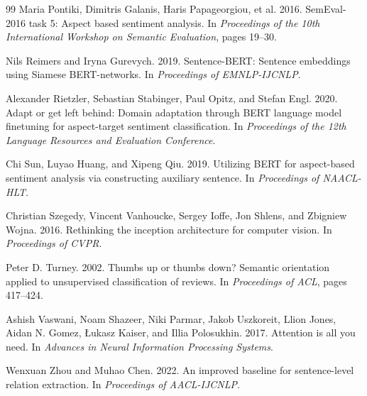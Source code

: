 \documentclass[11pt]{article}
\begin{document}
\begin{thebibliography}{99}
Maria Pontiki, Dimitris Galanis, Haris Papageorgiou, et al. 2016. SemEval-2016 task 5: Aspect based sentiment analysis. In \textit{Proceedings of the 10th International Workshop on Semantic Evaluation}, pages 19--30.

Nils Reimers and Iryna Gurevych. 2019. Sentence-BERT: Sentence embeddings using Siamese BERT-networks. In \textit{Proceedings of EMNLP-IJCNLP}.

Alexander Rietzler, Sebastian Stabinger, Paul Opitz, and Stefan Engl. 2020. Adapt or get left behind: Domain adaptation through BERT language model finetuning for aspect-target sentiment classification. In \textit{Proceedings of the 12th Language Resources and Evaluation Conference}.

Chi Sun, Luyao Huang, and Xipeng Qiu. 2019. Utilizing BERT for aspect-based sentiment analysis via constructing auxiliary sentence. In \textit{Proceedings of NAACL-HLT}.

Christian Szegedy, Vincent Vanhoucke, Sergey Ioffe, Jon Shlens, and Zbigniew Wojna. 2016. Rethinking the inception architecture for computer vision. In \textit{Proceedings of CVPR}.

Peter D. Turney. 2002. Thumbs up or thumbs down? Semantic orientation applied to unsupervised classification of reviews. In \textit{Proceedings of ACL}, pages 417--424.

Ashish Vaswani, Noam Shazeer, Niki Parmar, Jakob Uszkoreit, Llion Jones, Aidan N. Gomez, {\L}ukasz Kaiser, and Illia Polosukhin. 2017. Attention is all you need. In \textit{Advances in Neural Information Processing Systems}.

Wenxuan Zhou and Muhao Chen. 2022. An improved baseline for sentence-level relation extraction. In \textit{Proceedings of AACL-IJCNLP}.

\end{thebibliography}
\end{document}
